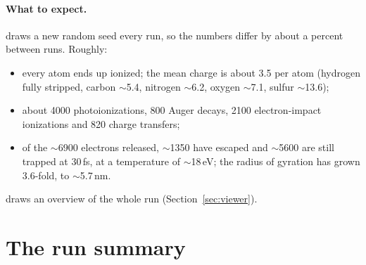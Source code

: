 \paragraph{What to expect.}
 draws a new random seed every run, so the numbers differ by about a percent between runs.
Roughly:
\begin{itemize}
  \item every atom ends up ionized; the mean charge is about 3.5 per atom (hydrogen fully stripped, carbon $\sim$5.4,
    nitrogen $\sim$6.2, oxygen $\sim$7.1, sulfur $\sim$13.6);
  \item about 4000 photoionizations, 800 Auger decays, 2100 electron-impact ionizations and 820 charge transfers;
  \item of the $\sim$6900 electrons released, $\sim$1350 have escaped and $\sim$5600 are still trapped at 30\,fs, at a
    temperature of $\sim$18\,eV; the radius of gyration has grown 3.6-fold, to $\sim$5.7\,nm.
\end{itemize}
 draws an overview of the whole run (Section~\ref{sec:viewer}).

\section{The run summary}
\label{sec:summary}

